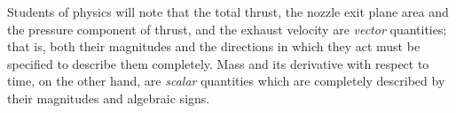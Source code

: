Students of physics will note that the total thrust, the nozzle exit plane area and the pressure
component of thrust, and the exhaust velocity are \emph{vector} quantities; that is, both their
magnitudes and the directions in which they act must be specified to describe them
completely. Mass and its derivative with respect to time, on the other hand,
are \emph{scalar} quantities which are completely described by their magnitudes and algebraic
signs.


